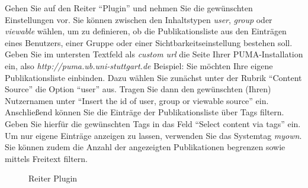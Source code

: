 Gehen Sie auf den Reiter \enquote{Plugin} und nehmen Sie die gewünschten Einstellungen vor. Sie können zwischen den Inhaltstypen \textit{user}, \textit{group} oder \textit{viewable} wählen, um zu definieren, ob die Publikationsliste aus den Einträgen eines Benutzers, einer Gruppe oder einer Sichtbarkeitseinstellung bestehen soll. Geben Sie im untersten Textfeld als \textit{custom url} die Seite Ihrer PUMA-Installation ein, also \textit{http://puma.ub.uni-stuttgart.de}\newline
\newline
Beispiel: Sie möchten Ihre eigene Publikationsliste einbinden. Dazu wählen Sie zunächst unter der Rubrik \enquote{Content Source} die Option \enquote{user} aus. Tragen Sie dann den gewünschten (Ihren) Nutzernamen unter \enquote{Insert the id of user, group or viewable source} ein. Anschließend können Sie die Einträge der Publikationsliste über Tags filtern. Geben Sie hierfür die gewünschten Tags in das Feld \enquote{Select content via tags} ein. Um nur eigene Einträge anzeigen zu lassen, verwenden Sie das Systemtag \textit{myown}. Sie können zudem die Anzahl der angezeigten Publikationen begrenzen sowie mittels Freitext filtern.
\begin{figure}[h!]
 \centering
 \caption{Reiter Plugin}
 \label{fig:reiterPlugin}
\end{figure}

